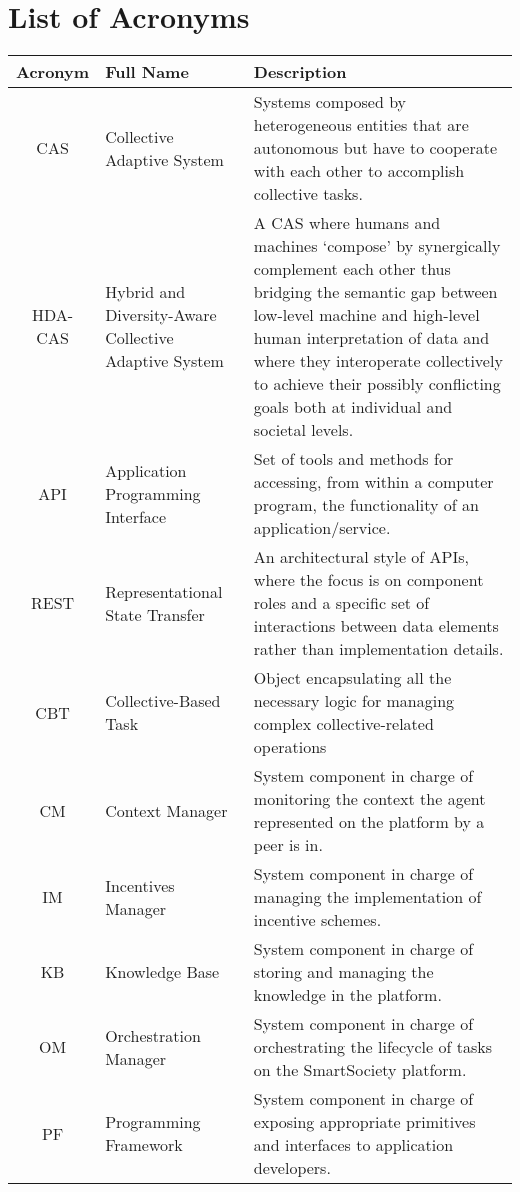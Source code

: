 \documentclass{SmartReport}
\begin{document}
\section*{List of Acronyms}
\begin{tabular}{|c|p{3cm}|p{10cm}|}
\hline 
\textbf{Acronym} & \textbf{Full Name} & \textbf{Description} \\
\hline 
\hline 
CAS & Collective Adaptive System & Systems composed by heterogeneous entities that are autonomous but have to cooperate with each other to accomplish collective tasks.\\ \hline
HDA-CAS & Hybrid and Diversity-Aware Collective Adaptive System & A CAS where humans and machines `compose' by synergically complement each other thus bridging the semantic gap between low-level machine and high-level human interpretation of data and where they interoperate collectively to achieve their possibly conflicting goals both at individual and societal levels.\\ \hline
API & Application Programming Interface & Set of tools and methods for accessing, from within a computer program, the functionality of an application/service. \\ \hline
REST & Representational State Transfer & An architectural style of APIs, where the focus is on component roles and a specific set of interactions between data elements rather than implementation details.\\ \hline
CBT & Collective-Based Task & Object encapsulating all the necessary logic for managing complex collective-related operations \\ \hline 
CM & Context Manager & System component in charge of monitoring the
context the agent represented on the platform by a peer is in.\\
\hline
IM & Incentives Manager & System component in charge of managing the implementation of incentive schemes.\\  
\hline 
KB & Knowledge Base &  System component in charge of storing and managing the knowledge in the platform.\\
\hline
OM & Orchestration Manager &  System component in charge of
orchestrating the lifecycle of tasks on the SmartSociety platform. \\
\hline 
PF & Programming Framework &  System component in charge of exposing
appropriate primitives and interfaces to application developers.\\

\end{tabular}
\end{document}
